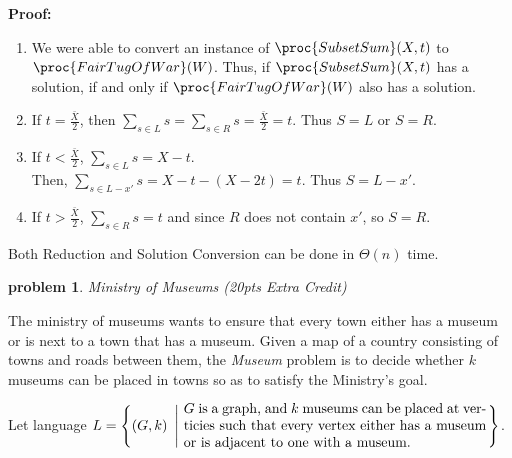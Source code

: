 \documentclass[11pt]{article}
\newtheorem{problem}{\sc\color{cit}problem}
\begin{document}
\noindent\textbf{Proof:}
\begin{enumerate}
    \item We were able to convert an instance of $\proc{SubsetSum}(X, t)$ to $\proc{FairTugOfWar}(W)$. Thus, if $\proc{SubsetSum}(X, t)$ has a solution, if and only if $\proc{FairTugOfWar}(W)$ also has a solution.
    \item If $t = \frac{\bar{X}}{2}$, then $\sum_{s \in L} s= \sum_{s \in R} s= \frac{\bar{X}}{2} = t$. Thus $S=L$ or $S=R$.
    \item If $t < \frac{\bar{X}}{2}$, $\sum_{s \in L} s= X - t$.\\
    Then, $\sum_{s \in L-{x'}} s = X - t - (X - 2t) = t$. Thus $S = L - {x'}$. 
    \item If $t > \frac{\bar{X}}{2}$, $\sum_{s \in R} s= t$ and since $R$ does not contain $x'$, so $S = R$.
\end{enumerate}


Both Reduction and Solution Conversion can be done in $\Theta(n)$ time.

\newpage

\begin{problem} Ministry of Museums (20pts Extra Credit) \end{problem}

\noindent The ministry of museums wants to ensure that every town either has a museum or is next to a town that has a museum.  Given a map of a country consisting of towns and roads between them, the {\em Museum} problem is to decide whether
$k$ museums can be placed in towns so as to satisfy the Ministry's goal.

\medskip

\noindent Let language $L = \left\{ (G,k) \ \left|  \ \parbox{3in}{ $G$ is a graph, and $k$ museums can be placed at verticies such that every vertex either has a museum or is adjacent to one  with a museum.} \right.\right\}$.
\end{document}
